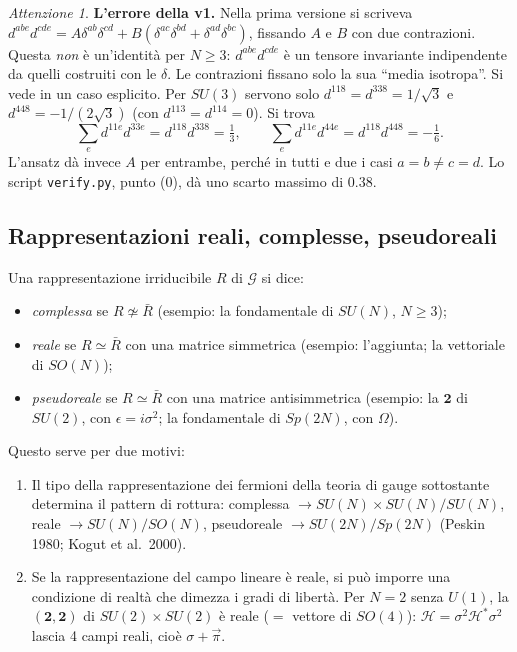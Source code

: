 \documentclass[11pt,a4paper]{article}
\numberwithin{equation}{section}
\theoremstyle{remark}
\newtheorem*{attenzione}{Attenzione}
\newcommand{\Hf}{\mathcal{H}}
\newcommand{\G}{\mathcal{G}}
\begin{document}
\begin{attenzione}
\textbf{L'errore della v1.} Nella prima versione si scriveva $d^{abe}d^{cde}=A\delta^{ab}\delta^{cd}+B(\delta^{ac}\delta^{bd}+\delta^{ad}\delta^{bc})$, fissando $A$ e $B$ con due contrazioni. Questa \emph{non} è un'identità per $N\ge3$: $d^{abe}d^{cde}$ è un tensore invariante indipendente da quelli costruiti con le $\delta$. Le contrazioni fissano solo la sua ``media isotropa''. Si vede in un caso esplicito. Per $SU(3)$ servono solo $d^{118}=d^{338}=1/\sqrt3$ e $d^{448}=-1/(2\sqrt3)$ (con $d^{113}=d^{114}=0$). Si trova
\[
\textstyle\sum_e d^{11e}d^{33e}=d^{118}d^{338}=\tfrac13,\qquad \sum_e d^{11e}d^{44e}=d^{118}d^{448}=-\tfrac16 .
\]
L'ansatz dà invece $A$ per entrambe, perché in tutti e due i casi $a=b\neq c=d$. Lo script \texttt{verify.py}, punto (0), dà uno scarto massimo di $0.38$.
\end{attenzione}

\subsection{Rappresentazioni reali, complesse, pseudoreali}

Una rappresentazione irriducibile $R$ di $\G$ si dice:
\begin{itemize}[nosep]
\item \emph{complessa} se $R\not\simeq\bar R$ (esempio: la fondamentale di $SU(N)$, $N\ge3$);
\item \emph{reale} se $R\simeq\bar R$ con una matrice simmetrica (esempio: l'aggiunta; la vettoriale di $SO(N)$);
\item \emph{pseudoreale} se $R\simeq\bar R$ con una matrice antisimmetrica (esempio: la $\mathbf 2$ di $SU(2)$, con $\epsilon=i\sigma^2$; la fondamentale di $Sp(2N)$, con $\Omega$).
\end{itemize}
Questo serve per due motivi:
\begin{enumerate}[nosep]
\item Il tipo della rappresentazione dei fermioni della teoria di gauge sottostante determina il pattern di rottura: complessa $\to SU(N)\times SU(N)/SU(N)$, reale $\to SU(N)/SO(N)$, pseudoreale $\to SU(2N)/Sp(2N)$ (Peskin 1980; Kogut et al.\ 2000).
\item Se la rappresentazione del campo lineare è reale, si può imporre una condizione di realtà che dimezza i gradi di libertà. Per $N=2$ senza $U(1)$, la $(\mathbf2,\mathbf2)$ di $SU(2)\times SU(2)$ è reale ($=$ vettore di $SO(4)$): $\Hf=\sigma^2\Hf^*\sigma^2$ lascia 4 campi reali, cioè $\sigma+\vec\pi$.
\end{enumerate}
\end{document}
